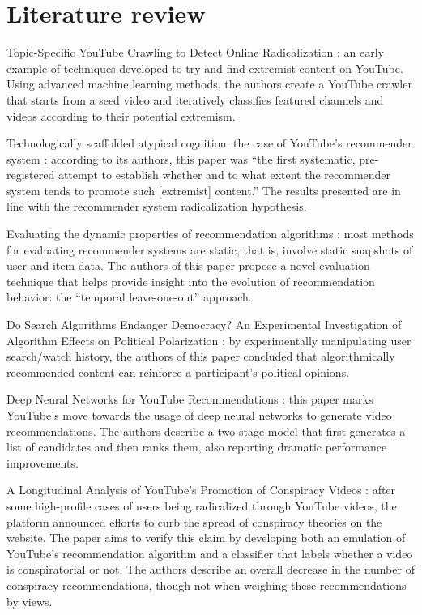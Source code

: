 
\chapter{Literature review}

Topic-Specific YouTube Crawling to Detect Online Radicalization
\citet{agarwal_topic-specific_2015}: an early example of techniques developed to
try and find extremist content on YouTube. Using advanced machine learning
methods, the authors create a YouTube crawler that starts from a seed video and
iteratively classifies featured channels and videos according to their potential
extremism.

Technologically scaffolded atypical cognition: the case of YouTube's recommender
system \citet{alfano_technologically_2020}: according to its authors, this paper
was ``the first systematic, pre-registered attempt to establish whether and to
what extent the recommender system tends to promote such [extremist] content.''
The results presented are in line with the recommender system radicalization
hypothesis.

Evaluating the dynamic properties of recommendation algorithms
\citet{burke_evaluating_2010}: most methods for evaluating recommender systems
are static, that is, involve static snapshots of user and item data. The authors
of this paper propose a novel evaluation technique that helps provide insight
into the evolution of recommendation behavior: the ``temporal leave-one-out''
approach.

Do Search Algorithms Endanger Democracy? An Experimental Investigation of
Algorithm Effects on Political Polarization \citet{cho_search_2020}: by
experimentally manipulating user search/watch history, the authors of this paper
concluded that algorithmically recommended content can reinforce a participant's
political opinions.

Deep Neural Networks for YouTube Recommendations \citet{covington_deep_2016}:
this paper marks YouTube's move towards the usage of deep neural networks to
generate video recommendations. The authors describe a two-stage model that
first generates a list of candidates and then ranks them, also reporting
dramatic performance improvements.

A Longitudinal Analysis of YouTube's Promotion of Conspiracy Videos
\citet{faddoul_longitudinal_2020}: after some high-profile cases of users being
radicalized through YouTube videos, the platform announced efforts to curb the
spread of conspiracy theories on the website. The paper aims to verify this
claim by developing both an emulation of YouTube's recommendation algorithm and
a classifier that labels whether a video is conspiratorial or not. The authors
describe an overall decrease in the number of conspiracy recommendations, though
not when weighing these recommendations by views.

